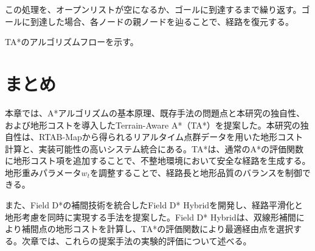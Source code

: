 この処理を、オープンリストが空になるか、ゴールに到達するまで繰り返す。ゴールに到達した場合、各ノードの親ノードを辿ることで、経路を復元する。

TA*のアルゴリズムフローを示す。

\section{まとめ}

本章では、A*アルゴリズムの基本原理、既存手法の問題点と本研究の独自性、および地形コストを導入したTerrain-Aware A*（TA*）を提案した。本研究の独自性は、RTAB-Mapから得られるリアルタイム点群データを用いた地形コスト計算と、実装可能性の高いシステム統合にある。TA*は、通常のA*の評価関数に地形コスト項を追加することで、不整地環境において安全な経路を生成する。地形重みパラメータ$w_t$を調整することで、経路長と地形品質のバランスを制御できる。

また、Field D*の補間技術を統合したField D* Hybridを開発し、経路平滑化と地形考慮を同時に実現する手法を提案した。Field D* Hybridは、双線形補間により補間点の地形コストを計算し、TA*の評価関数により最適経由点を選択する。次章では、これらの提案手法の実験的評価について述べる。